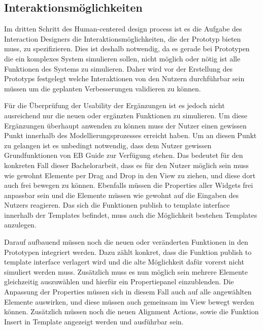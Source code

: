 \subsection{Interaktionsmöglichkeiten}

Im dritten Schritt des Human-centered design process ist es die Aufgabe des Interaction Designers die Interaktionsmöglichkeiten, die der Prototyp bieten muss, zu spezifizieren.
Dies ist deshalb notwendig, da es gerade bei Prototypen die ein komplexes System simulieren sollen, nicht möglich oder nötig ist alle Funktionen des Systems zu simulieren.
Daher wird vor der Erstellung des Prototyps festgelegt welche Interaktionen von den Nutzern durchführbar sein müssen um die geplanten Verbesserungen validieren zu können.

Für die Überprüfung der Usability der Ergänzungen ist es jedoch nicht ausreichend nur die neuen oder ergänzten Funktionen zu simulieren.
Um diese Ergänzungen überhaupt anwenden zu können muss der Nutzer einen gewissen Punkt innerhalb des Modellierungsprozesses erreicht haben.
Um an diesen Punkt zu gelangen ist es unbedingt notwendig, dass dem Nutzer gewissen Grundfunktionen von EB Guide zur Verfügung stehen.
Das bedeutet für den konkreten Fall dieser Bachelorarbeit, dass es für den Nutzer möglich sein muss wie gewohnt Elemente per Drag and Drop in den View zu ziehen, und diese dort auch frei bewegen zu können.
Ebenfalls müssen die Properties aller Widgets frei anpassbar sein und die Elemente müssen wie gewohnt auf die Eingaben des Nutzers reagieren.
Das sich die Funktionen \glqq publish to template interface\grqq{} innerhalb der Templates befindet, muss auch die Möglichkeit bestehen Templates anzulegen.

Darauf aufbauend müssen noch die neuen oder veränderten Funktionen in den Prototypen integriert werden.
Dazu zählt konkret, dass die Funktion \glqq publish to template interface\grqq{} verlagert wird und die alte Möglichkeit dafür vorerst nicht simuliert werden muss.
Zusätzlich muss es nun möglich sein mehrere Elemente gleichzeitig auszuwählen und hierfür ein Propertiepanel einzublenden.
Die Anpassung der Properties müssen sich in diesem Fall auch auf alle angewählten Elemente auswirken, und diese müssen auch gemeinsam im View bewegt werden können.
Zusätzlich müssen noch die neuen Alignment Actions, sowie die Funktion Insert in Template angezeigt werden und ausführbar sein.


